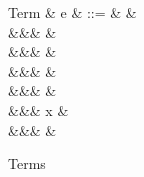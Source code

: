 \begin{figure}[H]
\begin{syntaxfig}
\mbox{Term}
&
e
&
::=
&
\exTrue \mid \exFalse
&
\\
&&&
&
\\
&&&
&
\\
&&&
\exNil
&
\\
&&&
&
\\
&&&
x
&
\\
&&&
\exOp{\primOp}
&
\end{syntaxfig}
\caption{Terms}
\end{figure}
